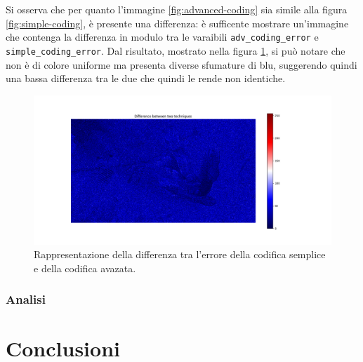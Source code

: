 \noindent Si osserva che per quanto l'immagine \ref{fig:advanced-coding} sia simile alla figura \ref{fig:simple-coding}, è presente una differenza: è sufficente mostrare un'immagine che contenga la differenza in modulo tra le varaibili \texttt{adv\_coding\_error} e \texttt{simple\_coding\_error}. Dal risultato, mostrato nella figura \ref{fig:error-difference}, si può notare che non è di colore uniforme ma presenta diverse sfumature di blu, suggerendo quindi una bassa differenza tra le due che quindi le rende non identiche.

\begin{figure}[h]
    \centering
    \includegraphics[width = .9\textwidth]{hw-1/report/imgs/error-difference.png}
    \caption{Rappresentazione della differenza tra l'errore della codifica semplice e della codifica avazata.}
    \label{fig:error-difference}
\end{figure}



\subsubsection{Analisi}





\vspace{30px}\section{Conclusioni}





